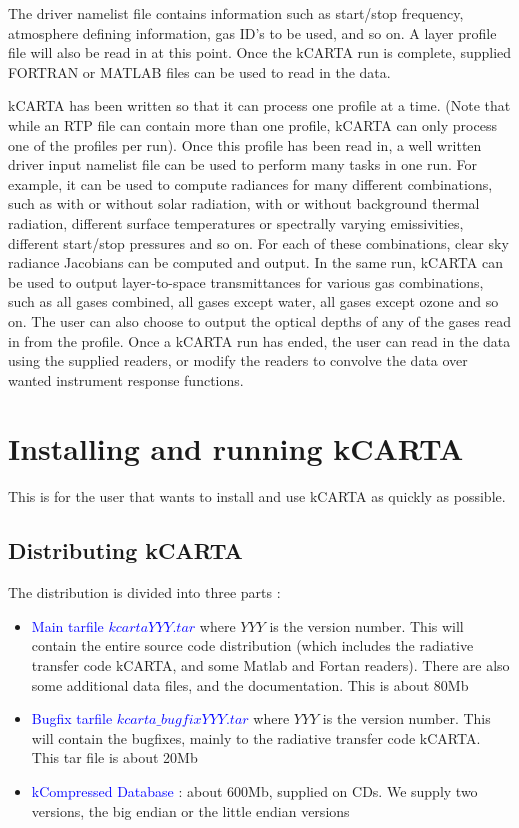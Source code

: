 \documentclass[12pt]{article}
\newcommand{\kc}{\textsf{kCARTA}\xspace}
\begin{document}
The driver namelist file contains information such as
start/stop frequency, atmosphere defining information, gas ID's to
be used, and so on.  A layer profile file will also
be read in at this point.  Once the \kc run is complete, supplied
{\sf FORTRAN} or {\sf MATLAB} files can be used to read in the data.

\kc has been written so that it can process one profile at a time. (Note that
while an RTP file can contain more than one profile, \kc can only process
one of the profiles per run). 
Once this profile has been read in, a well written driver input namelist file
can be used to perform many tasks in one run.  For example, it can be
used to compute radiances for many different combinations, such as
with or without solar radiation, with or without background thermal
radiation, different surface temperatures or spectrally varying
emissivities, different start/stop pressures and so on.  For each of
these combinations, clear sky radiance Jacobians can be computed and output. In
the same run, \kc can be used to output layer-to-space transmittances
for various gas combinations, such as all gases combined, all gases
except water, all gases except ozone and so on.  The user can also
choose to output the optical depths of any of the gases read in from
the profile.  Once a \kc run has ended, the user can read in the data
using the supplied readers, or modify the readers to convolve the data
over wanted instrument response functions.

\section{Installing and running \kc}
This is for the user that wants to install and use \kc as quickly as possible. 

\subsection{Distributing \kc}
The distribution is divided into three parts :

\begin{itemize}
\item \textcolor{blue} {Main tarfile $kcartaYYY.tar$} where $YYY$ is the 
version number. This will contain the entire source code distribution (which 
includes the radiative transfer code \kc, and some Matlab and Fortan readers).
There are also some additional data files, and the documentation. This is 
about 80Mb\\
\item \textcolor{blue} {Bugfix tarfile $kcarta\_bugfixYYY.tar$} where $YYY$ 
is the version number.
This will contain the bugfixes, mainly to the radiative transfer code \kc. This
tar file is about 20Mb \\
\item \textcolor{blue} {kCompressed Database} : about 600Mb, supplied on CDs. 
We supply two versions, the big endian or the little endian versions \\
\end{itemize}
\end{document}
